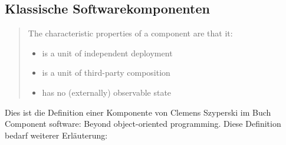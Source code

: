 \subsection{Klassische Softwarekomponenten}
\label{sec:2_Softwarekomponente_Klassisch}
\begin{quote}
\glqq The characteristic properties of a component are that it:
\begin{itemize}
\item is a unit of independent deployment
\item is a unit of third-party composition
\item has no (externally) observable state\grqq
\end{itemize}
\end{quote}

Dies ist die Definition einer Komponente von Clemens Szyperski im Buch \glqq Component software: Beyond object-oriented programming\grqq \citereset \autocite{Szyperski.2002}.
Diese Definition bedarf weiterer Erläuterung:
